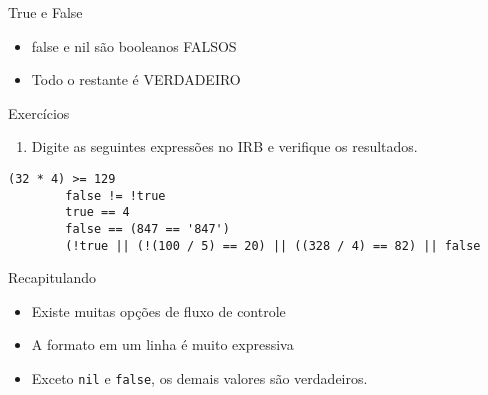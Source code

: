 \begin{frame}[fragile,t]{True e False}
  \begin{itemize}
    \item \alert{false} e \alert{nil} são booleanos \alert{FALSOS}
    \item Todo o restante é \alert{VERDADEIRO}
	
  \end{itemize}   
\end{frame}
\begin{frame}[fragile,t]{Exercícios}
  \begin{enumerate}
    \item Digite as seguintes expressões no IRB e verifique os resultados.
  \end{enumerate}
	\begin{lstlisting}[style=RubyInputStyle]
		(32 * 4) >= 129
		false != !true
		true == 4
		false == (847 == '847')
		(!true || (!(100 / 5) == 20) || ((328 / 4) == 82) || false 
	\end{lstlisting}
\end{frame}
\begin{frame}[fragile,t]{Recapitulando}
  \begin{itemize}
    \item Existe muitas opções de fluxo de controle
    \item A formato em um linha é muito expressiva
    \item Exceto \verb!nil! e \verb!false!, os demais valores são verdadeiros.
  \end{itemize}
\end{frame}



